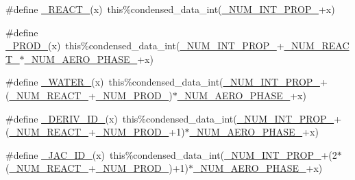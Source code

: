 \begin{DoxyCompactItemize}
\item 
\#define \mbox{\hyperlink{rxn__condensed__phase__arrhenius_8_f90_a2465fb6c1cce932a0bb29dac2975ee64}{\+\_\+\+R\+E\+A\+C\+T\+\_\+}}(x)~this\%condensed\+\_\+data\+\_\+int(\mbox{\hyperlink{sub__model___u_n_i_f_a_c_8_f90_a54f7194dc6a244f7eb7a78f88b3362ba}{\+\_\+\+N\+U\+M\+\_\+\+I\+N\+T\+\_\+\+P\+R\+O\+P\+\_\+}}+x)
\item 
\#define \mbox{\hyperlink{rxn__condensed__phase__arrhenius_8_f90_ad730666d44e45e220232510d9e15ec79}{\+\_\+\+P\+R\+O\+D\+\_\+}}(x)~this\%condensed\+\_\+data\+\_\+int(\mbox{\hyperlink{sub__model___u_n_i_f_a_c_8_f90_a54f7194dc6a244f7eb7a78f88b3362ba}{\+\_\+\+N\+U\+M\+\_\+\+I\+N\+T\+\_\+\+P\+R\+O\+P\+\_\+}}+\mbox{\hyperlink{rxn__troe_8_f90_aee1fee52189b85b8a55162815b7eb2ab}{\+\_\+\+N\+U\+M\+\_\+\+R\+E\+A\+C\+T\+\_\+}}$\ast$\mbox{\hyperlink{rxn___s_i_m_p_o_l__phase__transfer_8c_a420df3d7e04a5101c904c5965cbc9897}{\+\_\+\+N\+U\+M\+\_\+\+A\+E\+R\+O\+\_\+\+P\+H\+A\+S\+E\+\_\+}}+x)
\item 
\#define \mbox{\hyperlink{rxn__condensed__phase__arrhenius_8_f90_a8b756083d750a1cbd58ed0f94d05af0d}{\+\_\+\+W\+A\+T\+E\+R\+\_\+}}(x)~this\%condensed\+\_\+data\+\_\+int(\mbox{\hyperlink{sub__model___u_n_i_f_a_c_8_f90_a54f7194dc6a244f7eb7a78f88b3362ba}{\+\_\+\+N\+U\+M\+\_\+\+I\+N\+T\+\_\+\+P\+R\+O\+P\+\_\+}}+(\mbox{\hyperlink{rxn__troe_8_f90_aee1fee52189b85b8a55162815b7eb2ab}{\+\_\+\+N\+U\+M\+\_\+\+R\+E\+A\+C\+T\+\_\+}}+\mbox{\hyperlink{rxn__troe_8_f90_a0ab2d7e00e334b5c52335f26ef6025e8}{\+\_\+\+N\+U\+M\+\_\+\+P\+R\+O\+D\+\_\+}})$\ast$\mbox{\hyperlink{rxn___s_i_m_p_o_l__phase__transfer_8c_a420df3d7e04a5101c904c5965cbc9897}{\+\_\+\+N\+U\+M\+\_\+\+A\+E\+R\+O\+\_\+\+P\+H\+A\+S\+E\+\_\+}}+x)
\item 
\#define \mbox{\hyperlink{rxn__condensed__phase__arrhenius_8_f90_a8df20fa2e866ca68998160fdeef08b19}{\+\_\+\+D\+E\+R\+I\+V\+\_\+\+I\+D\+\_\+}}(x)~this\%condensed\+\_\+data\+\_\+int(\mbox{\hyperlink{sub__model___u_n_i_f_a_c_8_f90_a54f7194dc6a244f7eb7a78f88b3362ba}{\+\_\+\+N\+U\+M\+\_\+\+I\+N\+T\+\_\+\+P\+R\+O\+P\+\_\+}}+(\mbox{\hyperlink{rxn__troe_8_f90_aee1fee52189b85b8a55162815b7eb2ab}{\+\_\+\+N\+U\+M\+\_\+\+R\+E\+A\+C\+T\+\_\+}}+\mbox{\hyperlink{rxn__troe_8_f90_a0ab2d7e00e334b5c52335f26ef6025e8}{\+\_\+\+N\+U\+M\+\_\+\+P\+R\+O\+D\+\_\+}}+1)$\ast$\mbox{\hyperlink{rxn___s_i_m_p_o_l__phase__transfer_8c_a420df3d7e04a5101c904c5965cbc9897}{\+\_\+\+N\+U\+M\+\_\+\+A\+E\+R\+O\+\_\+\+P\+H\+A\+S\+E\+\_\+}}+x)
\item 
\#define \mbox{\hyperlink{rxn__condensed__phase__arrhenius_8_f90_af0ecfa7b0240c903b78101cd3e4ac0c7}{\+\_\+\+J\+A\+C\+\_\+\+I\+D\+\_\+}}(x)~this\%condensed\+\_\+data\+\_\+int(\mbox{\hyperlink{sub__model___u_n_i_f_a_c_8_f90_a54f7194dc6a244f7eb7a78f88b3362ba}{\+\_\+\+N\+U\+M\+\_\+\+I\+N\+T\+\_\+\+P\+R\+O\+P\+\_\+}}+(2$\ast$(\mbox{\hyperlink{rxn__troe_8_f90_aee1fee52189b85b8a55162815b7eb2ab}{\+\_\+\+N\+U\+M\+\_\+\+R\+E\+A\+C\+T\+\_\+}}+\mbox{\hyperlink{rxn__troe_8_f90_a0ab2d7e00e334b5c52335f26ef6025e8}{\+\_\+\+N\+U\+M\+\_\+\+P\+R\+O\+D\+\_\+}})+1)$\ast$\mbox{\hyperlink{rxn___s_i_m_p_o_l__phase__transfer_8c_a420df3d7e04a5101c904c5965cbc9897}{\+\_\+\+N\+U\+M\+\_\+\+A\+E\+R\+O\+\_\+\+P\+H\+A\+S\+E\+\_\+}}+x)

\end{DoxyCompactItemize}

